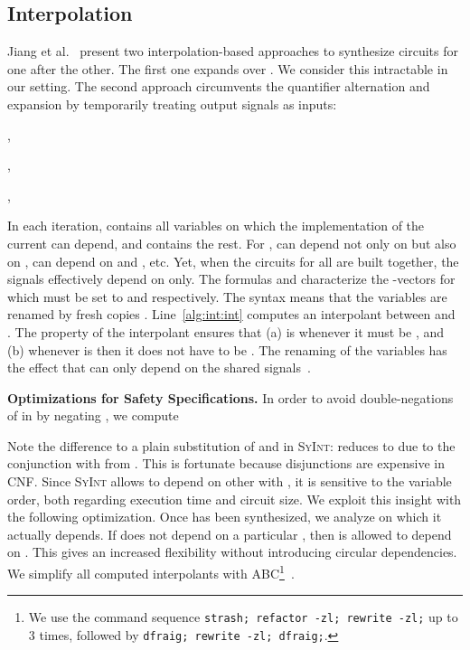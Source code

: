 \documentclass[conference]{IEEEtran}
\newcommand{\Abc}{\textsf{ABC}\xspace}
\begin{document}
\subsection{Interpolation} \label{sec:interpol}

Jiang et al.~\cite{JiangLH09} present two interpolation-based approaches to 
synthesize circuits for one  after the other.  The first one 
expands  over .  We consider this intractable in our setting. 
The second approach circumvents the quantifier alternation and expansion by 
temporarily treating output signals as inputs:
\begin{algorithmic}[1]
  \State ,\;\;
         
  \For{}
    \State ,\;
           
    \State 
    \State 
    \State 
    \State \label{alg:int:int}
    \State ,\;\;
            \label{alg:int:resub}
  \EndFor
\EndProcedure
\end{algorithmic}
In each iteration,  contains all variables on which the 
implementation of the current  can depend, and  
contains the rest.  For ,  can 
depend not only on  but also on ,  can 
depend on  and , etc.  Yet, when the circuits 
for all  are built together, the signals  
effectively depend on  only. The formulas  and  
characterize the -vectors for which  must be set to
 and  respectively.  The syntax 
 means that the variables  are 
renamed by fresh copies . Line~\ref{alg:int:int} computes an 
interpolant between  and .  The property  of the interpolant ensures that (a)  is  
whenever it must be , and (b) whenever  is  then it does not 
have to be .  The renaming of the variables  has the 
effect that  can only depend on the shared signals~.

\textbf{Optimizations for Safety Specifications.} In order to avoid
double-negations of  in  by negating , we compute

Note the difference to a plain substitution of  
and  in \textsc{SyInt}:  
reduces to  due to the conjunction with  from .  This is 
fortunate because disjunctions are expensive in CNF. Since \textsc{SyInt} allows 
 to depend on other  with , it is sensitive to the variable 
order, both regarding execution time and circuit size. We exploit this insight 
with the following optimization. Once  has been synthesized, we analyze on 
which  it actually depends. If  does not depend on a particular , 
then  is allowed to depend on . This gives an increased flexibility 
without introducing circular dependencies.  We simplify all computed 
interpolants with \Abc\footnote{We use the command sequence \texttt{strash; 
refactor -zl; rewrite -zl;} up to 3 times, followed by \texttt{dfraig; rewrite 
-zl; dfraig;}.}~\cite{BraytonM10}.  
\end{document}
